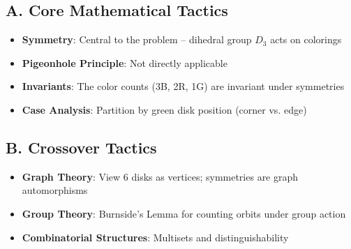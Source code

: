 \documentclass[11pt]{article}
\begin{document}
\begin{tacticalbox}
\subsection*{A. Core Mathematical Tactics}
\begin{itemize}[leftmargin=*]
    \item \textbf{Symmetry}: Central to the problem -- dihedral group $D_3$ acts on colorings
    \item \textbf{Pigeonhole Principle}: Not directly applicable
    \item \textbf{Invariants}: The color counts (3B, 2R, 1G) are invariant under symmetries
    \item \textbf{Case Analysis}: Partition by green disk position (corner vs. edge)
\end{itemize}

\subsection*{B. Crossover Tactics}
\begin{itemize}[leftmargin=*]
    \item \textbf{Graph Theory}: View 6 disks as vertices; symmetries are graph automorphisms
    \item \textbf{Group Theory}: Burnside's Lemma for counting orbits under group action
    \item \textbf{Combinatorial Structures}: Multisets and distinguishability
\end{itemize}
\end{tacticalbox}
\end{document}
